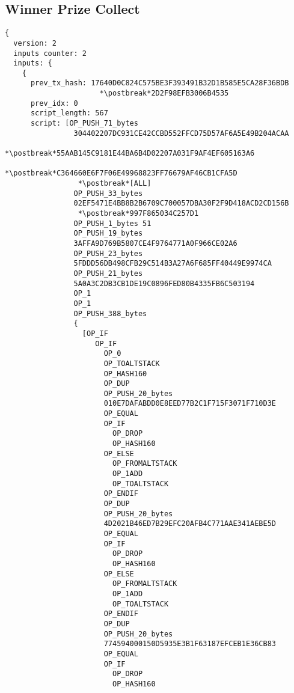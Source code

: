 \subsection{Winner Prize Collect}\label{app:winner_collect}
\begin{lstlisting}
{
  version: 2
  inputs counter: 2
  inputs: {
    {
      prev_tx_hash: 17640D0C824C575BE3F393491B32D1B585E5CA28F36BDB
                      *\postbreak*2D2F98EFB3006B4535
      prev_idx: 0
      script_length: 567
      script: [OP_PUSH_71_bytes
                304402207DC931CE42CCBD552FFCD75D57AF6A5E49B204ACAA
                 *\postbreak*55AAB145C9181E44BA6B4D02207A031F9AF4EF605163A6
                 *\postbreak*C364660E6F7F06E49968823FF76679AF46CB1CFA5D
                 *\postbreak*[ALL]
                OP_PUSH_33_bytes
                02EF5471E4BB8B2B6709C700057DBA30F2F9D418ACD2CD156B
                 *\postbreak*997F865034C257D1
                OP_PUSH_1_bytes 51
                OP_PUSH_19_bytes
                3AFFA9D769B5807CE4F9764771A0F966CE02A6
                OP_PUSH_23_bytes
                5FDDD56DB498CFB29C514B3A27A6F685FF40449E9974CA
                OP_PUSH_21_bytes
                5A0A3C2DB3CB1DE19C0896FED80B4335FB6C503194
                OP_1
                OP_1
                OP_PUSH_388_bytes
                {
                  [OP_IF
                     OP_IF
                       OP_0
                       OP_TOALTSTACK
                       OP_HASH160
                       OP_DUP
                       OP_PUSH_20_bytes
                       010E7DAFABDD0E8EED77B2C1F715F3071F710D3E
                       OP_EQUAL
                       OP_IF
                         OP_DROP
                         OP_HASH160
                       OP_ELSE
                         OP_FROMALTSTACK
                         OP_1ADD
                         OP_TOALTSTACK
                       OP_ENDIF
                       OP_DUP
                       OP_PUSH_20_bytes
                       4D2021B46ED7B29EFC20AFB4C771AAE341AEBE5D
                       OP_EQUAL
                       OP_IF
                         OP_DROP
                         OP_HASH160
                       OP_ELSE
                         OP_FROMALTSTACK
                         OP_1ADD
                         OP_TOALTSTACK
                       OP_ENDIF
                       OP_DUP
                       OP_PUSH_20_bytes
                       774594000150D5935E3B1F63187EFCEB1E36CB83
                       OP_EQUAL
                       OP_IF
                         OP_DROP
                         OP_HASH160

\end{lstlisting}
